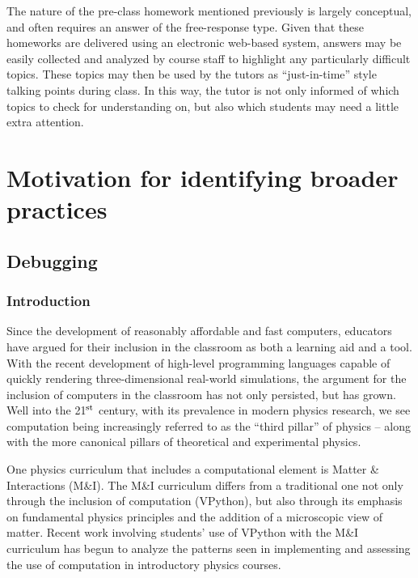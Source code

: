 \documentclass{msuphddissertation}
\begin{document}
\begin{doublespace}
The nature of the pre-class homework mentioned previously is largely conceptual, and often requires an answer of the free-response type.  Given that these homeworks are delivered using an electronic web-based system, answers may be easily collected and analyzed by course staff to highlight any particularly difficult topics.  These topics may then be used by the tutors as ``just-in-time'' style talking points during class.  In this way, the tutor is not only informed of which topics to check for understanding on, but also which students may need a little extra attention.

%
%

\chapter{Motivation for identifying broader practices}

\section{Debugging}

\subsection{Introduction}

Since the development of reasonably affordable and fast computers, educators have argued for their inclusion in the classroom as both a learning aid and a tool.\cite{DiSess1986,Shecker1993}  With the recent development of high-level programming languages capable of quickly rendering three-dimensional real-world simulations, the argument for the inclusion of computers in the classroom has not only persisted, but has grown.\cite{Chonacky2008}  Well into the 21$^{\rm st}$ century, with its prevalence in modern physics research, we see computation being increasingly referred to as the ``third pillar'' of physics -- along with the more canonical pillars of theoretical and experimental physics.\cite{Chabay2008}

One physics curriculum that includes a computational element is Matter \& Interactions (M\&I).  The M\&I curriculum differs from a traditional one not only through the inclusion of computation (VPython), but also through its emphasis on fundamental physics principles and the addition of a microscopic view of matter.\cite{Chabay2004,Chabay1999}  Recent work\cite{Kohlmyer2005,Caballero2012} involving students' use of VPython with the M\&I curriculum has begun to analyze the patterns seen in implementing and assessing the use of computation in introductory physics courses.


\end{doublespace}
\end{document}
